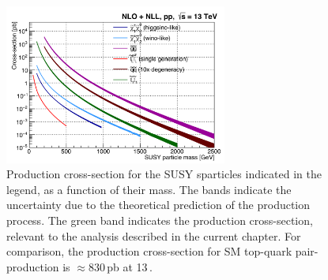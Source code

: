 \begin{figure}[!htb]
    \begin{center}
        \includegraphics[width=0.65\textwidth]{figures/search_stop2l/SUSY_xsec_13TeV_v1}
        \caption{
            Production cross-section for the SUSY sparticles indicated in the legend,
            as a function of their mass.
            The bands indicate the uncertainty due to the theoretical prediction of the production
            process.
            The green band indicates the \stopone production cross-section, relevant to the analysis
            described in the current chapter.
            For comparison, the production cross-section for SM top-quark pair-production is $\approx 830$\,pb at 13\,\TeV.
        }
        \label{fig:susy_xsec}
    \end{center}
\end{figure}


\FloatBarrier
%
%






%
%
%
%
%
%
%
%
%
